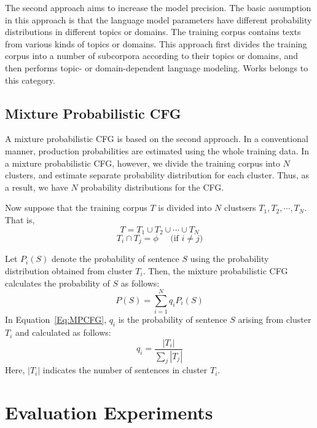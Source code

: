 The second approach aims to increase the model precision.
The basic assumption in this approach is that
the language model parameters have different probability distributions
in different topics or domains.
The training corpus contains texts from various kinds of topics or domains.
This approach first divides the training corpus into a number of subcorpora
according to their topics or domains,
and then performs topic- or domain-dependent language modeling.
Works \cite{Carter94,Iyer94} belongs to this category.

\subsection{Mixture Probabilistic CFG}

A mixture probabilistic CFG is based on the second approach.
In a conventional manner,
production probabilities are estimated using the whole training data.
In a mixture probabilistic CFG, however,
we divide the training corpus into $N$ clusters,
and estimate separate probability distribution for each cluster.
Thus, as a result, we have $N$ probability distributions for the CFG.

Now suppose that the training corpus $T$ is divided into
$N$ clustsers $T_{1},T_{2},\cdots,T_{N}$.
That is,
\begin{equation}
	T = T_{1} \cup T_{2} \cup \cdots \cup T_{N}
\end{equation}
\begin{equation}
	T_{i} \cap T_{j} = \phi \;\;\;\;\; \mbox{(if $i \neq j$)}
\end{equation}

Let $P_{i}(S)$ denote
the probability of sentence $S$ using the probability distribution
obtained from cluster $T_{i}$.
Then, the mixture probabilistic CFG calculates
the probability of $S$ as follows:
\begin{equation}
	P(S) = \sum_{i=1}^{N} q_{i} P_{i}(S)  \label{Eq:MPCFG}
\end{equation}
In Equation~\ref{Eq:MPCFG},
$q_{i}$ is the probability of sentence $S$ arising from cluster $T_{i}$
and calculated as follows:
\begin{equation}
	q_{i} = \frac{|T_{i}|}{\sum_{j} |T_{j}|}
\end{equation}
Here, $|T_{i}|$ indicates the number of sentences in cluster $T_{i}$.

\section{Evaluation Experiments}

